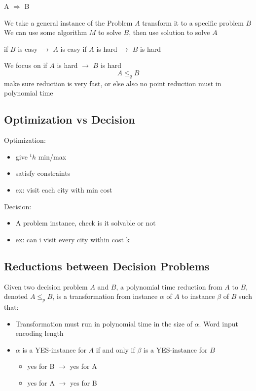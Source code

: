 \documentclass{article}
\begin{document}
\begin{multicols*}{4}
A $\Rightarrow$ B

We take a general instance of the Problem $A$ transform it to a specific problem $B$
We can use some algorithm $M$ to solve $B$, then use solution to solve $A$

if $B$ is easy $\rightarrow$ $A$ is easy
if $A$ is hard $\rightarrow$ $B$ is hard


We focus on 
if $A$ is hard $\rightarrow$ $B$ is hard
$$A\leq_q B $$
make sure reduction is very fast, or else also no point
reduction must in polynomial time

\subsection{Optimization vs Decision}
Optimization:
\begin{itemize}
	\item give $^th$ min/max
	\item satisfy constraints
	\item ex: visit each city with min cost
\end{itemize}
	
Decision:
\begin{itemize}
	\item A problem instance, check is it solvable or not
	\item ex: can i visit every city within cost k
\end{itemize}

\subsection{Reductions between Decision Problems}
Given two decision problem $A$ and $B$, a polynomial time reduction from $A$ to $B$, denoted $A \leq_p B$, is a transformation from instance $\alpha$ of $A$ to instance $\beta$ of $B$ such that:
\begin{itemize}
\item Transformation must run in polynomial time in the size of $\alpha$. Word input encoding length
\item $\alpha$ is a YES-instance for $A$ if and only if $\beta$ is a YES-instance for $B$
	\begin{itemize}
		\item yes for B $\rightarrow$ yes for A
		\item yes for A $\rightarrow$ yes for B 
	\end{itemize}
\end{itemize}


\end{multicols*}
\end{document}
